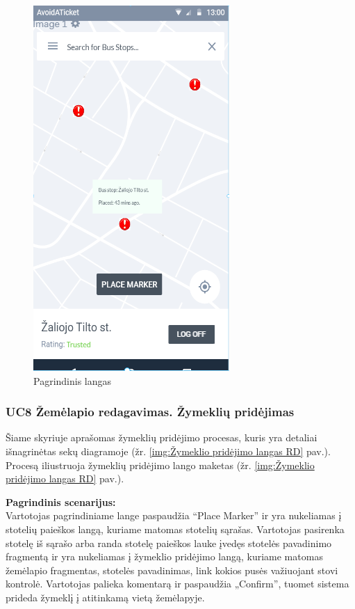 \documentclass{VUMIFPSkursinis}
\begin{document}
	\begin{figure}[H]
				\centering
				\includegraphics[scale=0.6]{img/mockup_Main_Window}
				\caption{Pagrindinis langas}
				\label{img:Pagrindinis langas}
			\end{figure}

\subsubsection{UC8 Žemėlapio redagavimas. Žymeklių pridėjimas}
	Šiame skyriuje aprašomas žymeklių pridėjimo procesas,  kuris yra detaliai išnagrinėtas sekų diagramoje (žr. \ref{img:Žymeklio pridėjimo langas RD} pav.). 
	Procesą iliustruoja žymeklių pridėjimo lango maketas (žr. \ref{img:Žymeklio pridėjimo langas RD} pav.).

	\textbf{Pagrindinis scenarijus:}\\
	Vartotojas pagrindiniame lange paspaudžia “Place Marker” ir yra nukeliamas į stotelių paieškos langą, kuriame matomas stotelių sąrašas. Vartotojas pasirenka stotelę iš sąrašo arba randa stotelę paieškos lauke įvedęs stotelės pavadinimo fragmentą ir yra nukeliamas į žymeklio pridėjimo langą, kuriame matomas žemėlapio fragmentas, stotelės pavadinimas, link kokios pusės važiuojant stovi kontrolė. Vartotojas palieka komentarą ir paspaudžia „Confirm”, tuomet sistema prideda žymeklį į atitinkamą vietą žemėlapyje.
\end{document}
